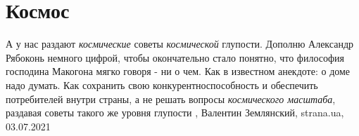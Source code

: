  
 
 
 
 
\chapter{Космос}

А у нас раздают \emph{космические} советы \emph{космической} глупости.  Дополню Александр
Рябоконь немного цифрой, чтобы окончательно стало понятно, что философия
господина Макогона мягко говоря - ни о чем.  Как в известном анекдоте: о доме
надо думать.  Как сохранить свою конкурентноспособность и обеспечить
потребителей внутри страны, а не решать вопросы \emph{космического масштаба}, раздавая
советы такого же уровня глупости
, 
Валентин Землянский, strana.ua, 03.07.2021
